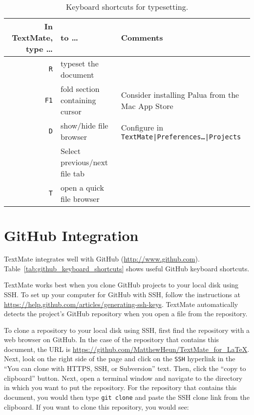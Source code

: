 \documentclass[10pt]{article}
\begin{document}
\begin{table}
\centering
\caption{Keyboard shortcuts for typesetting.}
\begin{tabular}{r|l|l}
	In TextMate, type \dots & to \dots      & Comments                  \\
	\hline
	\cmdkey\texttt{R}           & typeset the document            &                           \\
	\texttt{F1}                 & fold section containing cursor  & Consider installing Palua from the Mac App Store \\
	\ctlkey\optkey\cmdkey\texttt{D}&show/hide file browser        & Configure in \texttt{TextMate|Preferences\dots|Projects} \\
	\cmdkey\shiftkey [, \cmdkey\shiftkey ] & Select previous/next file tab  &          \\
	\cmdkey\texttt{T}           & open a quick file browser                 &          \\
	
\end{tabular}
\label{tab:typesetting_keyboard_shortcuts}
\end{table}



\section{GitHub Integration} %
\label{sec:github_integration}

TextMate integrates well with GitHub (\url{http://www.github.com}). 
Table~\ref{tab:github_keyboard_shortcuts} shows useful GitHub keyboard shortcuts.

TextMate works best when you clone GitHub projects to your local disk using SSH. 
To set up your computer for GitHub with SSH, follow the instructions at
\url{https://help.github.com/articles/generating-ssh-keys}. 
TextMate automatically detects the project's GitHub repository 
when you open a file from the repository.

To clone a repository to your local disk using SSH, 
first find the repository with a web browser on GitHub.
In the case of the repository that contains this document, 
the URL is \url{https://github.com/MatthewHeun/TextMate_for_LaTeX}. 
Next, look on the right side of the page and click on 
the \texttt{SSH} hyperlink in the 
``You can clone with HTTPS, SSH, or Subversion'' text.
Then, click the ``copy to clipboard'' button.
Next, open a terminal window and navigate to the directory in which you want to 
put the repository.
For the repository that contains this document, you would then type
\texttt{git clone} and paste the SSH clone link from the clipboard.
If you want to clone this repository, you would see:
\end{document}
